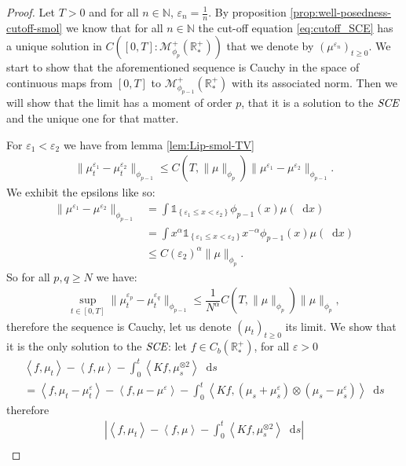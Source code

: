 \documentclass[11pt,a4paper]{article}
\newcommand{\NN}{\mathbb{N}}
\newcommand{\RRP}{\mathbb{R}^+_*}
\newcommand{\MC}{\mathcal{M}}
\newcommand{\SCE}{\emph{SCE}}
\newcommand{\Proc}[1]{\left(#1\right)_{t\geq 0}}
\newcommand{\indic}[1]{\mathds{1}_{\left\lbrace#1\right\rbrace}}
\newcommand{\brac}[1]{\left\langle#1\right\rangle}
\newcommand{\dd}{\mathop{}\!\mathrm{d}}
\begin{document}
\begin{proof}
    Let $T > 0$ and for all $n\in \NN$, $\varepsilon_n = \frac1n$. By proposition \ref{prop:well-posedness-cutoff-smol} we know that for all $n \in \NN$ the cut-off equation \eqref{eq:cutoff_SCE} has a unique solution in $C\left([0,T]: \MC_{\phi_{p}}^+ (\RRP)\right)$ that we denote by $\Proc{\mu^{\varepsilon_n}}$. We start to show that the aforementioned sequence is Cauchy in the space of continuous maps from $[0,T]$ to $\MC_{\phi_{p-1}}^+ (\RRP)$ with its associated norm. Then we will show that the limit has a moment of order $p$, that it is a solution to the $\SCE$ and the unique one for that matter.
    
    For $\varepsilon_1 < \varepsilon_2$ we have from lemma \ref{lem:Lip-smol-TV} 
    \begin{align*}
        \| \mu_t^{\varepsilon_1}- \mu_t^{\varepsilon_2}\|_{\phi_{p-1}} \leq C(T,\|\mu\|_{\phi_{p}}) \| \mu^{\varepsilon_1}- \mu^{\varepsilon_2}\|_{\phi_{p-1}}.
    \end{align*}
    We exhibit the epsilons like so:
    \begin{align*}
        \| \mu^{\varepsilon_1}- \mu^{\varepsilon_2}\|_{\phi_{p-1}} &= \int\indic{\varepsilon_1 \leq x < \varepsilon_2} \phi_{p-1}(x)\mu(\dd x)\\
        &= \int x^{\alpha} \indic{\varepsilon_1 \leq x < \varepsilon_2} x^{-\alpha}\phi_{p-1}(x)\mu(\dd x)\\
        &\leq C(\varepsilon_2)^\alpha \|\mu\|_{\phi_{p}}.
    \end{align*}
    So for all $p,q \geq N$ we have:
    \begin{align*}
        \sup\limits_{t \in [0,T]} \| \mu_t^{\varepsilon_p}- \mu_t^{\varepsilon_q}\|_{\phi_{p-1}} \leq \dfrac{1}{N^\alpha} C(T,\|\mu\|_{\phi_{p}}) \| \mu\|_{\phi_p},
    \end{align*}
    therefore the sequence is Cauchy, let us denote $\Proc{\mu_t}$ its limit. We show that it is the only solution to the $\SCE$: let $f \in C_b(\RRP)$, for all $\varepsilon > 0$
    \begin{multline*}
        \brac{f,\mu_t} - \brac{f,\mu} - \int_0^t\brac{Kf,\mu_s^{\otimes 2}}\dd s \\
        = \brac{f,\mu_t-\mu_t^\varepsilon} - \brac{f,\mu-\mu^\varepsilon} - \int_0^t\brac{Kf,(\mu_s+ \mu^\varepsilon_s)\otimes (\mu_s - \mu^\varepsilon_s)}\dd s
    \end{multline*}
    therefore
    \begin{multline*}
        \left|\brac{f,\mu_t} - \brac{f,\mu} - \int_0^t\brac{Kf,\mu_s^{\otimes 2}}\dd s\right|\\

\end{multline*}
\end{proof}
\end{document}
